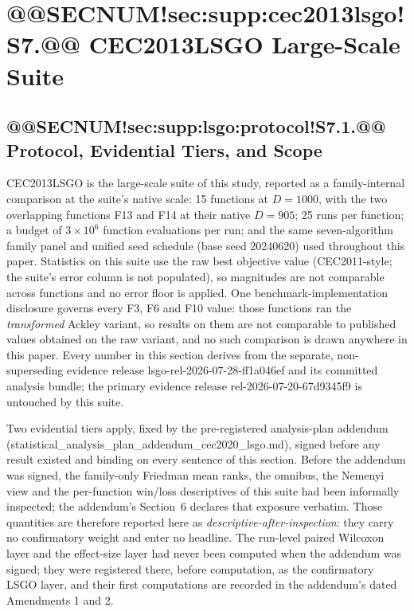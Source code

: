 \documentclass[10pt,a4paper]{article}
\begin{document}
\section{@@SECNUM!sec:supp:cec2013lsgo!S7.@@ CEC2013LSGO Large-Scale Suite}\label{sec:supp:cec2013lsgo}

\subsection{@@SECNUM!sec:supp:lsgo:protocol!S7.1.@@ Protocol, Evidential Tiers, and Scope}\label{sec:supp:lsgo:protocol}

\noindent CEC2013LSGO is the large-scale suite of this study, reported as a
family-internal comparison at the suite's native scale: 15 functions at
$D = 1000$, with the two overlapping functions F13 and F14 at their native
$D = 905$; 25 runs per function; a budget of $3 \times 10^{6}$ function
evaluations per run; and the same seven-algorithm family panel and unified
seed schedule (base seed 20240620) used throughout this
paper.  Statistics on this suite use the raw best
objective value (CEC2011-style; the suite's error column is not populated),
so magnitudes are not comparable across functions and no error floor is
applied.  One benchmark-implementation disclosure governs every F3, F6 and
F10 value: those functions ran the \emph{transformed} Ackley variant, so
results on them are not comparable to published values obtained on the raw
variant, and no such comparison is drawn anywhere in this paper.
Every number in this section derives from the separate, non-superseding
evidence release lsgo-rel-2026-07-28-ff1a046ef and its committed analysis
bundle; the primary evidence release rel-2026-07-20-67d9345f9 is untouched
by this suite.




Two evidential tiers apply, fixed by the pre-registered analysis-plan
addendum (statistical\_analysis\_plan\_addendum\_cec2020\_lsgo.md), signed
before any result existed and binding on every sentence of this section.
Before the addendum was signed, the family-only Friedman mean ranks, the
omnibus, the Nemenyi view and the per-function win/loss descriptives of
this suite had been informally inspected; the addendum's Section~6
declares that exposure verbatim.  Those quantities are therefore reported
here as \emph{descriptive-after-inspection}: they carry no confirmatory
weight and enter no headline.  The run-level paired Wilcoxon layer and the
effect-size layer had never been computed when the addendum was signed;
they were registered there, before computation, as the confirmatory LSGO
layer, and their first computations are recorded in the addendum's dated
Amendments 1 and 2.
\end{document}
